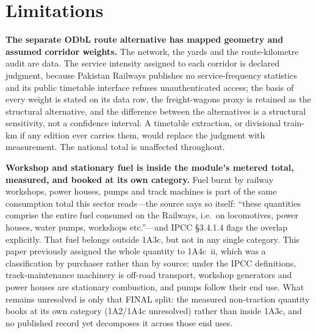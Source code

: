\section{Limitations}
\label{sec:limitations}

\textbf{The separate ODbL route alternative has mapped geometry and assumed corridor weights.} The
network, the yards and the route-kilometre audit are data. The service intensity assigned
to each corridor is declared judgment, because Pakistan Railways publishes no
service-frequency statistics and its public timetable interface refuses unauthenticated
access; the basis of every weight is stated on its data row, the freight-wagons proxy is
retained as the structural alternative, and the difference between the alternatives is a structural sensitivity, not a confidence interval. A timetable extraction, or divisional train-km if
any edition ever carries them, would replace the judgment with measurement. The national
total is unaffected throughout.

\textbf{Workshop and stationary fuel is inside the module's metered total, measured, and
booked at its own category.} Fuel burnt by railway workshops, power houses, pumps and track
machines is part of the same consumption total this sector reads---the source says so
itself: ``these quantities comprise the entire fuel consumed on the Railways, i.e.\ on
locomotives, power houses, water pumps, workshops etc.''---and IPCC §3.4.1.4 flags the
overlap explicitly. That fuel belongs outside 1A3c, but not in any single category. This
paper previously assigned the whole quantity to 1A4c~ii, which was a classification by
purchaser rather than by source: under the IPCC definitions, track-maintenance machinery is
off-road transport, workshop generators and power houses are stationary combustion, and
pumps follow their end use. What remains unresolved is only that FINAL split: the measured
non-traction quantity books at its own category (1A2/1A4c unresolved) rather than inside
1A3c, and no published record yet decomposes it across those end uses.

